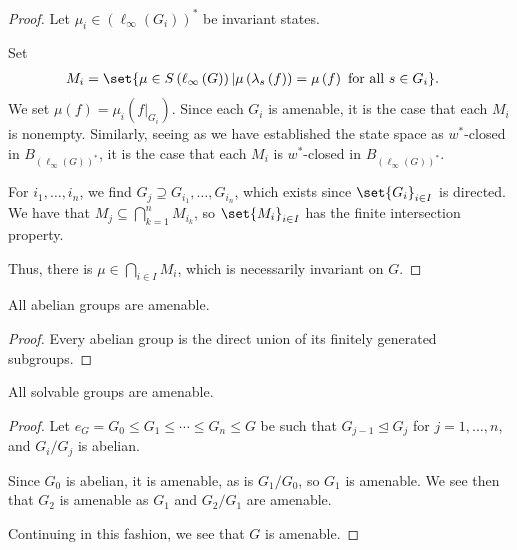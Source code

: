 \begin{proof}
  Let $\mu_i\in \left(\ell_{\infty}\left(G_i\right)\right)^{\ast}$ be invariant states.\newline

  Set
  \begin{align*}
    M_i &= \set{\mu\in S\left(\ell_{\infty}\left(G\right)\right)| \mu\left(\lambda_s\left(f\right)\right) = \mu\left(f\right)\text{ for all }s\in G_i}.
  \end{align*}
  We set $\mu\left(f\right) = \mu_i\left(f|_{G_i}\right)$. Since each $G_i$ is amenable, it is the case that each $M_i$ is nonempty. Similarly, seeing as we have established the state space as $w^{\ast}$-closed in $B_{\left(\ell_{\infty}\left(G\right)\right)^{\ast}}$, it is the case that each $M_i$ is $w^{\ast}$-closed in $B_{\left(\ell_{\infty}\left(G\right)\right)^{\ast}}$.\newline

  For $i_1,\dots,i_n$, we find $G_j \supseteq G_{i_1},\dots,G_{i_n}$, which exists since $\set{G_i}_{i\in I}$ is directed. We have that $M_j\subseteq \bigcap_{k=1}^{n}M_{i_k}$, so $\set{M_i}_{i\in I}$ has the finite intersection property.\newline

  Thus, there is $\mu\in \bigcap_{i\in I}M_i$, which is necessarily invariant on $G$.
\end{proof}
\begin{corollary}
  All abelian groups are amenable.
\end{corollary}
\begin{proof}
  Every abelian group is the direct union of its finitely generated subgroups.
\end{proof}
\begin{corollary}
  All solvable groups are amenable.
\end{corollary}
\begin{proof}
  Let $e_G = G_0 \leq G_1\leq\cdots\leq G_n\leq G$ be such that $G_{j-1}\trianglelefteq G_j$ for $j=1,\dots,n$, and $G_i/G_j$ is abelian.\newline

  Since $G_0$ is abelian, it is amenable, as is $G_1/G_0$, so $G_1$ is amenable. We see then that $G_2$ is amenable as $G_1$ and $G_2/G_1$ are amenable.\newline

  Continuing in this fashion, we see that $G$ is amenable.
\end{proof}

